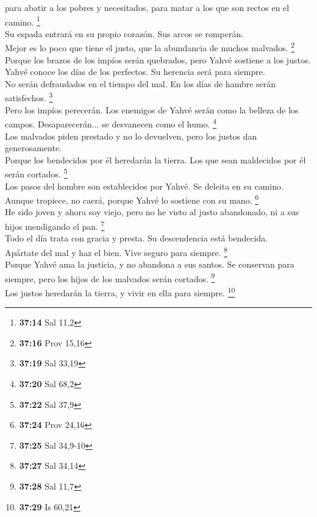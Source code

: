 para abatir a los pobres y necesitados, para matar a los que son rectos
en el camino. \footnote{\textbf{37:14} Sal 11,2}\\
 Su espada entrará en su propio corazón. Sus arcos se
romperán.\\
 Mejor es lo poco que tiene el justo, que la abundancia
de muchos malvados. \footnote{\textbf{37:16} Prov 15,16}\\
 Porque los brazos de los impíos serán quebrados, pero
Yahvé sostiene a los justos.\\
 Yahvé conoce los días de los perfectos. Su herencia será
para siempre.\\
 No serán defraudados en el tiempo del mal. En los días
de hambre serán satisfechos. \footnote{\textbf{37:19} Sal 33,19}\\
 Pero los impíos perecerán. Los enemigos de Yahvé serán
como la belleza de los campos. Desaparecerán... se desvanecen como el
humo. \footnote{\textbf{37:20} Sal 68,2}\\
 Los malvados piden prestado y no lo devuelven, pero los
justos dan generosamente.\\
 Porque los bendecidos por él heredarán la tierra. Los
que sean maldecidos por él serán cortados. \footnote{\textbf{37:22} Sal
  37,9}\\
 Los pasos del hombre son establecidos por Yahvé. Se
deleita en su camino.\\
 Aunque tropiece, no caerá, porque Yahvé lo sostiene con
su mano. \footnote{\textbf{37:24} Prov 24,16}\\
 He sido joven y ahora soy viejo, pero no he visto al
justo abandonado, ni a sus hijos mendigando el pan. \footnote{\textbf{37:25}
  Sal 34,9-10}\\
 Todo el día trata con gracia y presta. Su descendencia
está bendecida.\\
 Apártate del mal y haz el bien. Vive seguro para
siempre. \footnote{\textbf{37:27} Sal 34,14}\\
 Porque Yahvé ama la justicia, y no abandona a sus
santos. Se conservan para siempre, pero los hijos de los malvados serán
cortados. \footnote{\textbf{37:28} Sal 11,7}\\
 Los justos heredarán la tierra, y vivir en ella para
siempre. \footnote{\textbf{37:29} Is 60,21}\\
